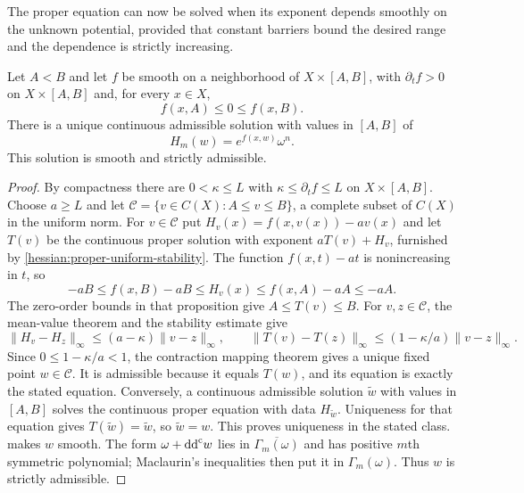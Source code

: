 The proper equation can now be solved when its exponent depends
smoothly on the unknown potential, provided that constant barriers
bound the desired range and the dependence is strictly increasing.

\begin{theorem}\label{hessian:proper-variable-existence}
Let $A<B$ and let $f$ be smooth on a neighborhood of
$X\times[A,B]$, with $\partial_tf>0$ on $X\times[A,B]$ and, for every
$x\in X$,
\[
 f(x,A)\leq0\leq f(x,B).
\]
There is a unique continuous admissible solution with values in
$[A,B]$ of
\[
 H_m(w)=e^{f(x,w)}\omega^n.
\]
This solution is smooth and strictly admissible.
\end{theorem}
\begin{proof}
By compactness there are $0<\kappa\leq L$ with
$\kappa\leq\partial_tf\leq L$ on $X\times[A,B]$. Choose $a\geq L$ and let
$\mathcal C=\{v\in C(X):A\leq v\leq B\}$, a complete subset of
$C(X)$ in the uniform norm. For $v\in\mathcal C$ put
$H_v(x)=f(x,v(x))-av(x)$ and let $T(v)$ be the continuous proper
solution with exponent $aT(v)+H_v$, furnished by
\cref{hessian:proper-uniform-stability}. The function $f(x,t)-at$
is nonincreasing in $t$, so
\[
 -aB\leq f(x,B)-aB\leq H_v(x)
                   \leq f(x,A)-aA\leq-aA.
\]
The zero-order bounds in that proposition give $A\leq T(v)\leq B$.
For $v,z\in\mathcal C$, the mean-value theorem and the stability
estimate give
\[
 \|H_v-H_z\|_\infty\leq(a-\kappa)\|v-z\|_\infty,
 \qquad
 \|T(v)-T(z)\|_\infty
          \leq(1-\kappa/a)\|v-z\|_\infty.
\]
Since $0\leq1-\kappa/a<1$, the contraction mapping theorem gives a unique
fixed point $w\in\mathcal C$. It is admissible because it equals
$T(w)$, and its equation is exactly the stated equation.
Conversely, a continuous admissible solution $\widetilde w$ with values
in $[A,B]$ solves the continuous proper equation with data
$H_{\widetilde w}$. Uniqueness for that equation gives
$T(\widetilde w)=\widetilde w$, so $\widetilde w=w$.
This proves uniqueness in the stated class.
 makes $w$ smooth.
The form $\omega+\mathrm{dd}^{\mathrm{c}} w$ lies in $\overline{\Gamma_m(\omega)}$ and has positive
$m$th symmetric polynomial; Maclaurin's inequalities then put it in
$\Gamma_m(\omega)$. Thus $w$ is strictly admissible.
\end{proof}
